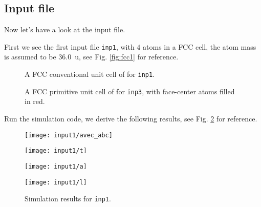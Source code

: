 
\subsection{Input file}

Now let's have a look at the input file.

First we see the first input file \texttt{inp1}, with $4$  atoms in a FCC cell,
the atom mass is assumed to be \SI{36.0}{\atomicmassunit},
see Fig. \ref{fig:fcc1} for reference.

\begin{figure}[h]
  \begin{minipage}{0.48\textwidth}
    \centering
    
    \caption{A FCC conventional unit cell of  for \texttt{inp1}.}
    \label{fig:fcc1}
  \end{minipage}
\hfill
  \begin {minipage}{0.48\textwidth}
  \centering
  
  \caption{A FCC primitive unit cell of  for \texttt{inp3}, with
  face-center atoms filled in red.}
  \label{fig:fcc3}
\end{minipage}
\end{figure}

Run the simulation code, we derive the following results,
see Fig. \ref{fig:input1} for reference.
\begin{figure}[h]
 \centering
 \begin{minipage}[t]{0.45\textwidth}
  \texttt{[image: input1/avec\_abc]}
  \label{fig:input1:avec}
 \end{minipage}
 \hfil
 \begin{minipage}[t]{0.45\textwidth}
  \texttt{[image: input1/t]}
  \label{fig:input1:e}
 \end{minipage}
 \hfil
 \vfill
 \begin{minipage}[t]{0.45\textwidth}
  \texttt{[image: input1/a]}
  \label{fig:input1:a}
 \end{minipage}
 \hfil
 \begin{minipage}[t]{0.45\textwidth}
  \texttt{[image: input1/l]}
  \label{fig:input1:l}
 \end{minipage}
 \caption{Simulation results for \texttt{inp1}.}
 \label{fig:input1}
\end{figure}


